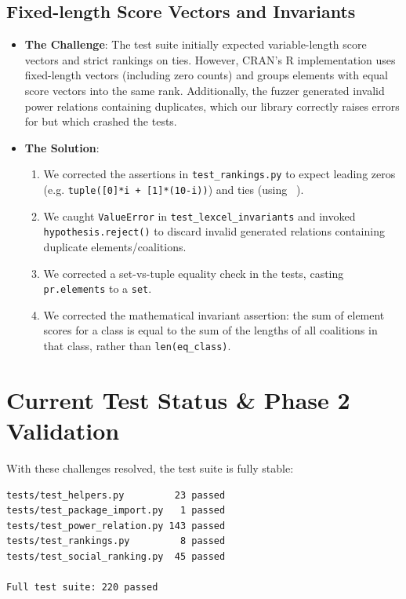 \documentclass[11pt]{article}
\newcommand{\pathitem}[1]{\texttt{#1}}
\begin{document}
\subsection{Fixed-length Score Vectors and Invariants}
\begin{itemize}
  \item \textbf{The Challenge}: The test suite initially expected variable-length score vectors and strict rankings on ties. However, CRAN's R implementation uses fixed-length vectors (including zero counts) and groups elements with equal score vectors into the same rank. Additionally, the fuzzer generated invalid power relations containing duplicates, which our library correctly raises errors for but which crashed the tests.
  \item \textbf{The Solution}: 
  \begin{enumerate}
    \item We corrected the assertions in \pathitem{test\_rankings.py} to expect leading zeros (e.g. \texttt{tuple([0]*i + [1]*(10-i))}) and ties (using \texttt{\string~}).
    \item We caught \pathitem{ValueError} in \pathitem{test\_lexcel\_invariants} and invoked \pathitem{hypothesis.reject()} to discard invalid generated relations containing duplicate elements/coalitions.
    \item We corrected a set-vs-tuple equality check in the tests, casting \pathitem{pr.elements} to a \pathitem{set}.
    \item We corrected the mathematical invariant assertion: the sum of element scores for a class is equal to the sum of the lengths of all coalitions in that class, rather than \texttt{len(eq\_class)}.
  \end{enumerate}
\end{itemize}

\section{Current Test Status \& Phase 2 Validation}

With these challenges resolved, the test suite is fully stable:

\begin{verbatim}
tests/test_helpers.py         23 passed
tests/test_package_import.py   1 passed
tests/test_power_relation.py 143 passed
tests/test_rankings.py         8 passed
tests/test_social_ranking.py  45 passed

Full test suite: 220 passed
\end{verbatim}
\end{document}
